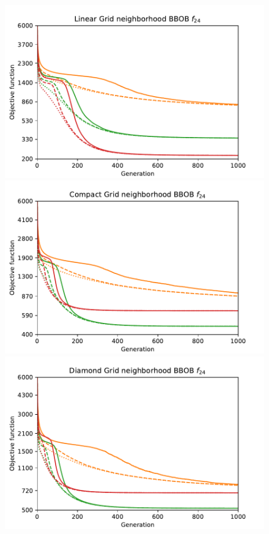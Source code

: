 \begin{figure}[ht!]
    \begin{minipage}[t]{0.32\textwidth}
        \centering
        \includegraphics[width=\textwidth]{img/runs/fitness_pso_f24_neighLinearGrid.pdf}
    \end{minipage}
    \hfill
    \begin{minipage}[t]{0.32\textwidth}
        \centering
        \includegraphics[width=\textwidth]{img/runs/fitness_pso_f24_neighCompactGrid.pdf}
    \end{minipage}
    \hfill
    \begin{minipage}[t]{0.32\textwidth}
        \centering
        \includegraphics[width=\textwidth]{img/runs/fitness_pso_f24_neighDiamondGrid.pdf}
    \end{minipage}


\end{figure}
